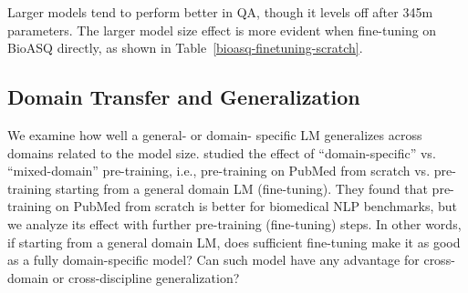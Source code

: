\documentclass[11pt,a4paper]{article}
\begin{document}
Larger models tend to perform better in QA, though it levels off after 345m parameters.
The larger model size effect is more evident when fine-tuning on BioASQ directly, as shown in Table~\ref{bioasq-finetuning-scratch}.

\begin{table}[h]
\centering
{}
\caption{\label{bioasq-finetuning-scratch}Results on BioASQ-7b factoid, without fine-tuning on SQuAD dataset first. The other models, including those using domain vocabularies, could not achieve any comparable results. A consistent pattern of improvement over model size noticeable on par with findings in general domain LM on SQuAD.}
\end{table}

\subsection{Domain Transfer and Generalization}

We examine how well a general- or domain- specific LM generalizes across domains related to the model size.
\citet{gu2020domain} studied the effect of ``domain-specific'' vs. ``mixed-domain'' pre-training, i.e., pre-training on PubMed from scratch vs. pre-training starting from a general domain LM (fine-tuning).
They found that pre-training on PubMed from scratch is better for biomedical NLP benchmarks, but we analyze its effect with further pre-training (fine-tuning) steps.
In other words, if starting from a general domain LM, does sufficient fine-tuning make it as good as a fully domain-specific model?
Can such model have any advantage for cross-domain or cross-discipline generalization?
\end{document}
